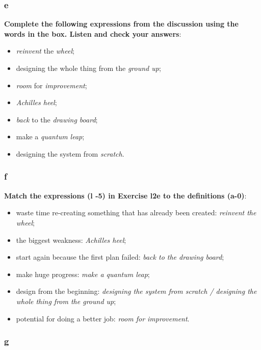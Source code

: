\subsubsection{e}

\textbf{Complete the following expressions from the discussion using the words in the box. Listen and check your answers}:

\begin{itemize}

\item \textit{reinvent} the \textit{wheel};
\item designing the whole thing from the \textit{ground up};
\item \textit{room} for \textit{improvement};
\item \textit{Achilles heel};
\item \textit{back} to the \textit{drawing board};
\item make a \textit{quantum leap};
\item designing the system from \textit{scratch}.

\end{itemize}

\subsubsection{f}

\textbf{Match the expressions (l -5) in Exercise l2e to the definitions (a-0)}:

\begin{itemize}

\item waste time re-creating something that has already been created: \textit{reinvent the wheel};
\item the biggest weakness: \textit{Achilles heel};
\item start again because the first plan failed: \textit{back to the drawing board};
\item make huge progress: \textit{make a quantum leap};
\item design from the beginning: \textit{designing the system from scratch / designing the whole thing from the ground up};
\item potential for doing a better job: \textit{room for improvement}.

\end{itemize}

\subsubsection{g}

